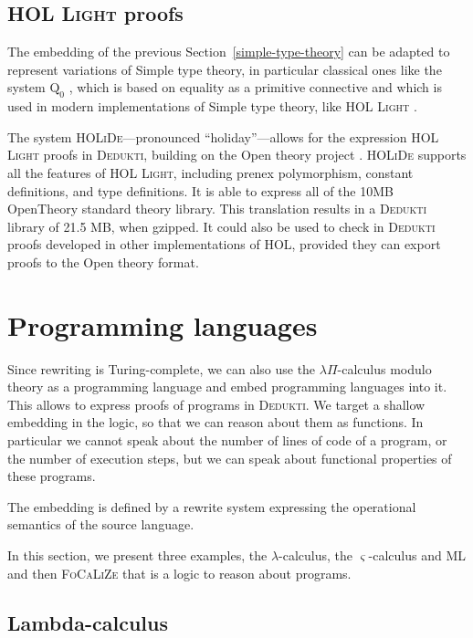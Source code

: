 \documentclass[english]{lipics}
\begin{document}
\subsection{{\textsc{HOL Light}} proofs}

The embedding of the previous Section~\ref{simple-type-theory} can be
adapted to represent variations of Simple type
theory, in particular classical ones like the system $\textrm{Q}_0$
\cite{Andrews86}, which is based on equality as a primitive connective
and which is used in modern implementations of Simple type theory,
like \textsc{HOL Light} \cite{AssafBurel2015}.

The system \textsc{HOLiDe}---pronounced ``holiday''---allows for the expression
\textsc{HOL Light} proofs in \textsc{Dedukti}, building on the Open
theory project \cite{Opentheory}.  \textsc{HOLiDe} supports all the
features of \textsc{HOL Light}, including prenex polymorphism, constant
definitions, and type definitions. It is able to express all of the
10MB OpenTheory standard theory library. This translation
results in a \textsc{Dedukti} library of 21.5 MB, when gzipped.
It could also be used to check in  \textsc{Dedukti} proofs developed
in other implementations of HOL, provided they can export proofs
to the Open theory format.


\section{Programming languages}
\label{sec:programming-languages}

Since rewriting is Turing-complete, we can also use the $\lambda
\Pi$-calculus modulo theory as a programming language and embed
programming languages into it. This allows to express proofs of programs
in \textsc{Dedukti}.  We target a shallow embedding in the logic, so
that we can reason about them as functions. In particular we cannot
speak about the number of lines of code of a program, or the number of
execution steps, but we can speak about functional properties of these
programs.

The embedding is defined by a rewrite system expressing the
operational semantics of the source language.

In this section, we present three examples, the $\lambda$-calculus,
the $\varsigma$-calculus and ML and then \textsc{FoCaLiZe} that is
a logic to reason about programs.

\subsection{Lambda-calculus}
\end{document}
